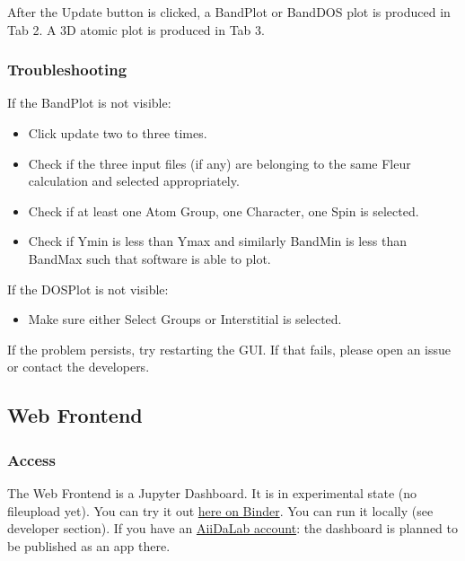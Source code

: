 After the Update button is clicked, a BandPlot or BandDOS plot is
produced in Tab 2. A 3D atomic plot is produced in Tab 3.

\subsubsection{Troubleshooting}\label{troubleshooting}

If the BandPlot is not visible:

\begin{itemize}
    \tightlist
\item
    Click update two to three times.
\item
    Check if the three input files (if any) are belonging to the same
    Fleur calculation and selected appropriately.
\item
    Check if at least one Atom Group, one Character, one Spin is selected.
\item
    Check if Ymin is less than Ymax and similarly BandMin is less than
    BandMax such that software is able to plot.
\end{itemize}

If the DOSPlot is not visible:
\begin{itemize}
    \tightlist
\item Make sure either Select Groups or Interstitial is selected.
\end{itemize}

If the problem persists, try restarting the GUI. If that fails, please open an
issue or contact the developers.

\subsection{Web Frontend}\label{web-frontend}

\subsubsection{Access}\label{access}

The Web Frontend is a Jupyter Dashboard. It is in experimental state (no
fileupload yet). You can try it out
\href{https://mybinder.org/v2/gh/JuDFTteam/masci-tools/studentproject18ws?filepath=studentproject18w\%2Ffrontend\%2Fjupyter\%2Fdemo\%2Fbinder_demo.ipynb}{here
  on Binder}. You can run it locally (see developer section). If you have an
\href{https://aiidalab.materialscloud.org/hub/login}{AiiDaLab account}: the
dashboard is planned to be published as an app there.

